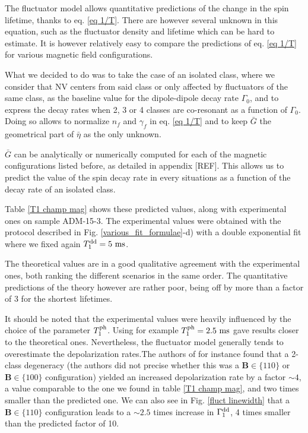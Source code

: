 \documentclass[a4paper,11pt]{report}
\begin{document}
The fluctuator model allows quantitative predictions of the change in the spin lifetime, thanks to eq. \ref{eq 1/T}. There are however several unknown in this equation, such as the fluctuator density and lifetime which can be hard to estimate. It is however relatively easy to compare the predictions of eq. \ref{eq 1/T} for various magnetic field configurations.

What we decided to do was to take the case of an isolated class, where we consider that NV centers from said class or only affected by fluctuators of the same class, as the baseline value for the dipole-dipole decay rate $\Gamma_0$, and to express the decay rates when 2, 3 or 4 classes are co-resonant as a function of $\Gamma_0$. Doing so allows to normalize $n_f$ and $\gamma_f$ in eq. \ref{eq 1/T} and to keep $\bar G$ the geometrical part of $\bar \eta$ as the only unknown.

$\bar G$ can be analytically or numerically computed for each of the magnetic configurations listed before, as detailed in appendix [REF]. This allows us to predict the value of the spin decay rate in every situations as a function of the decay rate of an isolated class.

Table \ref{T1 champ mag} shows these predicted values, along with experimental ones on sample ADM-15-3. The experimental values were obtained with the protocol described in Fig. \ref{various_fit_formulae}-d) with a double exponential fit where we fixed again $T_1^{\rm dd}=5\ \rm ms$.

The theoretical values are in a good qualitative agreement with the experimental ones, both ranking the different scenarios in the same order. The quantitative predictions of the theory however are rather poor, being off by more than a factor of 3 for the shortest lifetimes.

It should be noted that the experimental values were heavily influenced by the choice of the parameter $T_1^{\rm ph}$. Using for example $T_1^{\rm ph}=2.5\ \rm ms$ gave results closer to the theoretical ones. Nevertheless, the fluctuator model generally tends to overestimate the depolarization rates.The authors of \citep{choi2017depolarization} for instance found that a 2-class degeneracy (the authors did not precise whether this was a $\mathbf{B} \in \{110\}$ or $\mathbf{B} \in \{100\}$ configuration) yielded an increased depolarization rate by a factor $\sim 4$, a value comparable to the one we found in table \ref{T1 champ mag}, and two times smaller than the predicted one. We can also see in Fig. \ref{fluct linewidth} that a $\mathbf{B} \in \{110\}$ configuration leads to a $\sim 2.5$ times increase in $\Gamma_1^{\rm dd}$, 4 times smaller than the predicted factor of 10.
\end{document}
